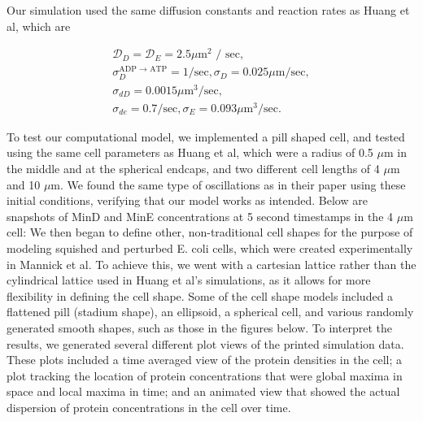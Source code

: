 \documentclass[letterpaper,twocolumn,amsmath,amssymb,pre]{revtex4-1}
\begin{document}
Our simulation used the same diffusion constants and reaction rates as
Huang et al, which are

\begin{gather*} %
  \mathcal{D}_D = \mathcal{D}_{E}  = 2.5 \mu \textrm{m$^2$ / sec}, \\
  \sigma_D^{\textrm{ADP $\rightarrow$ ATP}}  = 1/\textrm{sec},  \sigma_D = 0.025 \mu \textrm{m/sec}, \\
  \sigma_{dD}  = 0.0015 \mu \textrm{m$^3$/sec}, \\
  \sigma_{de}  = 0.7/\textrm{sec}, \sigma_E = 0.093 \mu \textrm{m$^3$/sec}.
\end{gather*}

To test our computational model, we implemented a pill shaped cell, and
tested using the same cell parameters as Huang et al, which were a radius
of 0.5 $\mu$m in the middle and at the spherical endcaps, and two different
cell lengths of 4 $\mu$m and 10 $\mu$m. We found the same type of
oscillations as in their paper using these initial conditions, verifying
that our model works as intended. Below are snapshots of MinD and MinE
concentrations at 5 second timestamps in the 4 $\mu$m cell:
\newline
{}
\newline
\newline
We then began to define other, non-traditional cell shapes for the purpose of
modeling squished and perturbed E. coli cells, which were created
experimentally in Mannick et al. To achieve this, we went with a
cartesian lattice rather than the cylindrical lattice used in Huang et 
al's simulations, as it allows for more flexibility in defining the 
cell shape. Some of the cell shape models included a flattened pill
(stadium shape), an ellipsoid, a spherical cell, and various randomly
generated smooth shapes, such as those in the figures below. 
\newline
{}
\newline
\newline
To interpret the results, we generated several different plot views of
the printed simulation data. These plots included a time averaged view
of the protein densities in the cell; a plot tracking the location of
protein concentrations that were global maxima in space and local maxima in 
time; and an animated view that showed the actual dispersion of
protein concentrations in the cell over time. 
\end{document}
